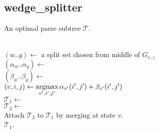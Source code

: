 \documentclass[11pt]{article}
\def\argmax{\mathop{\mathrm{argmax}}\limits}
\begin{document}
\subsection{wedge\_splitter}
\begin{algorithm}
         {An optimal parse subtree $\mathcal{T}$.}

\begin{algtab}
  \algreturn {}\\
\algelse
  $(w..y) \leftarrow$ a split set chosen from middle of $G_{r..z}$\\
  $(\alpha_w..\alpha_y) \leftarrow$ \\
  $(\beta_w..\beta_y)   \leftarrow$ \\
  $(v,i,j) \leftarrow \argmax\limits_{v',i',j'} 
	\alpha_{v'}(i',j') + \beta_{v'}(i',j')$\\
  $\mathcal{T}_1 \leftarrow$ \\
  $\mathcal{T}_2 \leftarrow$ \\
  Attach $\mathcal{T}_2$ to $\mathcal{T}_1$ by merging at state $v$.\\
  
  \algreturn $\mathcal{T}_1$.\\
\algend
\end{algtab}
\end{algorithm}
\end{document}
